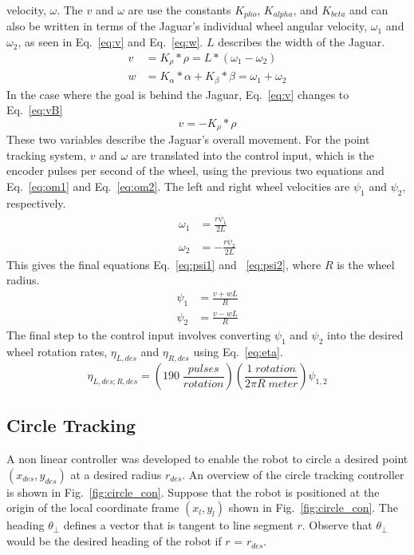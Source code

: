 \documentclass[conference]{../IEEEtran}
\begin{document}
velocity, $\omega$. The $v$ and $\omega$ are use the constants $K_{pho}$, $K_{alpha}$, and
$K_{beta}$ and can also be written in terms of the Jaguar's individual wheel angular
velocity, $\omega_1$ and $\omega_2$, as seen in Eq.~\ref{eq:v} and Eq.~\ref{eq:w}. $L$
describes the width of the Jaguar.
\begin{align}
v &= K_{\rho}*\rho = L*(\omega_1-\omega_2)
\label{eq:v}\\
w &= K_{\alpha}*\alpha+K_{\beta}*\beta = \omega_1+\omega_2
\label{eq:w}
\end{align}
In the case where the goal is behind the Jaguar, Eq.~\ref{eq:v} changes to Eq.~\ref{eq:vB}
\begin{equation}
v = -K_{\rho}*\rho
\label{eq:vB}
\end{equation}
These two variables describe the Jaguar's overall movement. For the point tracking system,
$v$ and $\omega$ are translated into the control input, which is the encoder pulses per
second of the wheel, using the previous two equations and Eq.~\ref{eq:om1} and
Eq.~\ref{eq:om2}. The left and right wheel velocities are $\psi_1$ and $\psi_2$,
respectively.
\begin{align}
\omega_1 &= \frac{r\dot{\psi}_1}{2L}
\label{eq:om1}\\
\omega_2 &= -\frac{r\dot{\psi}_2}{2L}
\label{eq:om2}
\end{align}
This gives the final equations Eq.~\ref{eq:psi1} and ~\ref{eq:psi2}, where $R$ is the
wheel radius.
\begin{align}
\psi_1 &= \frac{v + w L}{R}
\label{eq:psi1}\\
\psi_2 &= \frac{v - w L}{R}
\label{eq:psi2}
\end{align}
The final step to the control input involves converting $\psi_1$ and $\psi_2$ into the
desired wheel rotation rates, $\eta_{L,des}$ and $\eta_{R,des}$ using Eq.~\ref{eq:eta}.
\begin{equation}
\eta_{L,des;R,des}=\left(190\; \frac{pulses}{rotation}\right)\left(\frac{1\; rotation}{2\pi R\; meter}\right)\psi_{1,2}
\label{eq:eta}
\end{equation}

\subsection{Circle Tracking} \label{sec:circle_theo}

A non linear controller was developed to enable the robot to circle a desired point
$(x_{des}, y_{des})$ at a desired radius $r_{des}$.  An overview of the circle tracking
controller is shown in Fig.~\ref{fig:circle_con}.  Suppose that the robot is positioned at
the origin of the local coordinate frame $(x_l, y_l)$ shown in Fig.~\ref{fig:circle_con}.
The heading $\theta_{\perp}$ defines a vector that is tangent to line segment $r$. Observe
that $\theta_{\perp}$ would be the desired heading of the robot if $r$ = $r_{des}$.
\end{document}
